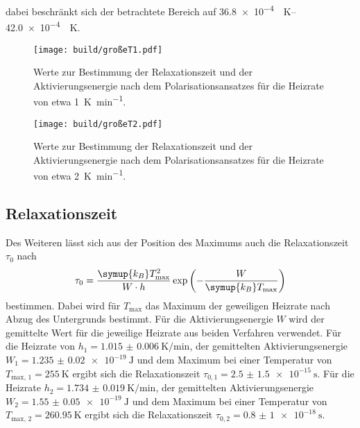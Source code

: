 dabei beschränkt sich der betrachtete Bereich auf \SIrange{36.8e-4}{42.0e-4}{\per\kelvin}.
\begin{figure}[htb]
  \centering
  \texttt{[image: build/großeT1.pdf]}
  \caption{Werte zur Bestimmung der Relaxationszeit und der Aktivierungsenergie nach dem Polarisationsansatzes für die Heizrate von etwa \SI{1}{\kelvin\per\minute}.}
  \label{fig:grT1}
\end{figure}
\begin{figure}[htb]
  \centering
  \texttt{[image: build/großeT2.pdf]}
  \caption{Werte zur Bestimmung der Relaxationszeit und der Aktivierungsenergie nach dem Polarisationsansatzes für die Heizrate von etwa \SI{2}{\kelvin\per\minute}.}
  \label{fig:grT2}
\end{figure}

\subsection{Relaxationszeit}
\label{sec:relax}
Des Weiteren lässt sich aus der Position des Maximums auch die Relaxationszeit $\tau_0$ nach
\begin{equation}
    \label{eqn:tau0}
    \tau_0 = \frac{\symup{k_B}T_\text{max}^2}{W \cdot h} \exp\left(-\frac{W}{\symup{k_B}T_\text{max}} \right)
\end{equation}
bestimmen. Dabei wird für $T_\text{max}$ das Maximum der geweiligen Heizrate nach Abzug des Untergrunds bestimmt.
Für die Aktivierungsenergie $W$ wird der gemittelte Wert für die jeweilige Heizrate aus beiden Verfahren verwendet.
Für die Heizrate von $h_1=\SI{1.015(6)}{\kelvin\per\minute}$, der gemittelten Aktivierungsenergie $W_1 = \SI{1.235(20)e-19}{\joule}$ und dem 
Maximum bei einer Temperatur von $T_\text{max, 1} = \SI{255}{\kelvin}$ ergibt sich die Relaxationszeit $\tau_{0,1} = \SI{2.5(15)e-15}{\second}$. 
Für die Heizrate $h_2=\SI{1.734(19)}{\kelvin\per\minute}$, der gemittelten Aktivierungsenergie $W_2 = \SI{1.55(5)e-19}{\joule}$ und dem 
Maximum bei einer Temperatur von $T_\text{max, 2} = \SI{260.95}{\kelvin}$ ergibt sich die Relaxationszeit $\tau_{0,2} = \SI{0.8(10)e-18}{\second}$.


\FloatBarrier